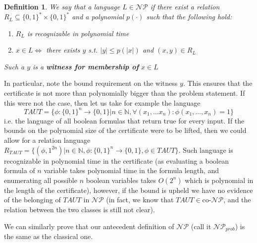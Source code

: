 \documentclass{article}
\newtheorem{definition}{Definition}
\begin{document}
\begin{definition}
We say that a language $L \in \mathcal{NP}$ if there exist a relation $R_L \subseteq \{0, 1\}^* \times \{0, 1\}^*$ and a polynomial $p(\cdot)$ such that the following hold: 
\begin{enumerate}
    \item $R_L$ is recognizable in polynomial time
    \item $x \in L \iff$ there exists $y$ s.t. $|y| \leq p(|x|)$ and $(x, y) \in R_L$
\end{enumerate}
Such a $y$ is a \textbf{witness for membership of } $x \in L$
\end{definition}
In particular, note the bound requirement on the witness $y$. This ensures that the certificate is not more than polynomially bigger than the problem statement. If this were not the case, then let us take for example the language \[TAUT = \{ \phi : \{0,1\}^n \to \{0,1\} | n \in \mathbb{N}, \forall (x_1, \dots x_n): \phi(x_1, \dots, x_n) = 1\}\]
i.e. the language of all boolean formulas that return true for every input. If the bounds on the polynomial size of the certificate were to be lifted, then we could allow for a relation language $R_{TAUT} = \{ (\phi, 1^{2n}) | n \in \mathbb{N}, \phi : \{0,1\}^n \to \{0,1\}, \phi \in TAUT  \}$. Such language is recognizable in polynomial time in the certificate (as evaluating a boolean formula of $n$ variable takes polynomial time in the formula length, and enumerating all possible $n$ boolean variables takes $O(2^n)$ which is polynomial in the length of the certificate), however, if the bound is upheld we have no evidence of the belonging of $TAUT$ in $\mathcal{NP}$ (in fact, we know that $TAUT \in \text{co-}\mathcal{NP}$, and the relation between the two classes is still not clear).

We can similarly prove that our antecedent definition of $\mathcal{NP}$ (call it $\mathcal{NP}_{prob}$) is the same as the classical one. 
\end{document}

